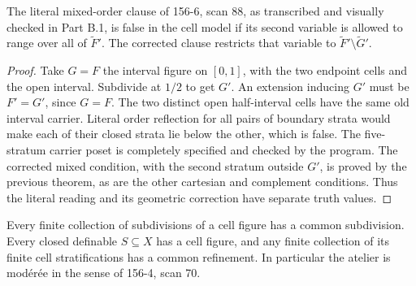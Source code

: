 \begin{counterexample}\label{SA21-BM-14bis-reading}
The literal mixed-order clause of 156-6, scan 88,
as transcribed and visually checked in Part B.1,
is false in the cell model if its second variable
is allowed to range over all of \(\widetilde F'\).
The corrected clause restricts that variable
to \(\widetilde F'\setminus\widetilde G'\).
\end{counterexample}

\begin{proof}
Take \(G=F\) the interval figure on \([0,1]\),
with the two endpoint cells and the open interval.
Subdivide at \(1/2\) to get \(G'\).
An extension inducing \(G'\) must be \(F'=G'\),
since \(G=F\). The two distinct open half-interval
cells have the same old interval carrier.
Literal order reflection for all pairs
of boundary strata would make each
of their closed strata lie below the other,
which is false. The five-stratum carrier
poset is completely specified and checked
by the program. The corrected mixed
condition, with the second stratum
outside \(G'\), is proved by the
previous theorem, as are the other
cartesian and complement conditions.
Thus the literal reading and its
geometric correction have separate
truth values.
\end{proof}

\begin{theorem}\label{SA21-BM-cell-moderation}
Every finite collection of subdivisions of a cell figure
has a common subdivision. Every closed definable
\(S\subseteq X\) has a cell figure, and any finite
collection of its finite cell stratifications
has a common refinement. In particular the
atelier is modérée in the sense of 156-4, scan 70.
\end{theorem}

